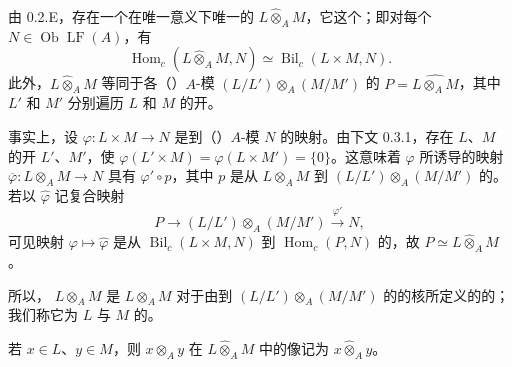 由 0.2.E，存在一个在唯一意义下唯一的 $L\widehat\otimes_A M$，它这个；即对每个 $N\in\operatorname{Ob}\operatorname{LF}(A)$，有
\[\operatorname{Hom}_c(L\widehat\otimes_A M,N)\simeq\operatorname{Bil}_c(L\times M,N).\]
此外，$L\widehat\otimes_A M$ 等同于各（）$A$-模 $(L/L')\otimes_A(M/M')$ 的 $P=\widehat{L\otimes_A M}$，其中 $L'$ 和 $M'$ 分别遍历 $L$ 和 $M$ 的开。

事实上，设 $\varphi:L\times M\to N$ 是到（）$A$-模 $N$ 的映射。由下文 0.3.1，存在 $L$、$M$ 的开 $L'$、$M'$，使 $\varphi(L'\times M)=\varphi(L\times M')=\{0\}$。这意味着 $\varphi$ 所诱导的映射 $\overline\varphi:L\otimes_A M\to N$ 具有 $\varphi'\circ p$，其中 $p$ 是从 $L\otimes_A M$ 到 $(L/L')\otimes_A(M/M')$ 的。若以 $\widehat\varphi$ 记复合映射
\[P\longrightarrow(L/L')\otimes_A(M/M')\xrightarrow{\varphi'}N,\]
可见映射 $\varphi\mapsto\widehat\varphi$ 是从 $\operatorname{Bil}_c(L\times M,N)$ 到 $\operatorname{Hom}_c(P,N)$ 的，故 $P\simeq L\widehat\otimes_A M$。

所以， $L\widehat\otimes_A M$ 是 $L\otimes_A M$ 对于由到 $(L/L')\otimes_A(M/M')$ 的的核所定义的的；我们称它为 $L$ 与 $M$ 的。

若 $x\in L$、$y\in M$，则 $x\otimes_A y$ 在 $L\widehat\otimes_A M$ 中的像记为 $x\widehat\otimes_A y$。

